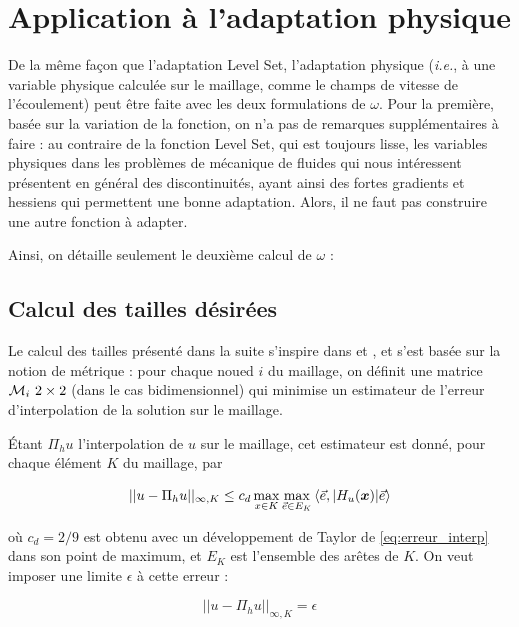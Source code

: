 \section{Application à l'adaptation physique}
\label{sec:adapPhysique}

\indent De la même façon que l'adaptation Level Set, l'adaptation physique (\emph{i.e.}, à une variable physique calculée sur le maillage, comme le champs de vitesse de l'écoulement) peut être faite avec les deux formulations de \(\omega\). Pour la première, basée sur la variation de la fonction, on n'a pas de remarques supplémentaires à faire : au contraire de la fonction Level Set, qui est toujours lisse, les variables physiques dans les problèmes de mécanique de fluides qui nous intéressent présentent en général des discontinuités, ayant ainsi des fortes gradients et hessiens qui permettent une bonne adaptation. Alors, il ne faut pas construire une autre fonction à adapter. 

\indent Ainsi, on détaille seulement le deuxième calcul de \(\omega\) :

\subsection{Calcul des tailles désirées}

\indent Le calcul des tailles présenté dans la suite s'inspire dans \cite{cecile_these} et \cite{frey_alauzet}, et s'est basée sur la notion de métrique : pour chaque noued \(i\) du maillage, on définit une matrice \(\met_i \ 2 \times 2\) (dans le cas bidimensionnel) qui minimise un estimateur de l'erreur d'interpolation de la solution sur le maillage.

\indent Étant \(\Pi_hu\) l'interpolation de \(u\) sur le maillage, cet estimateur est donné, pour chaque élément \(K\) du maillage, par

\begin{equation}
	\label{eq:erreur_interp}
	||u-\Pi_hu||_{\infty,K} \leq c_d \max_{x \in K}{\max_{\vec{e} \in E_K}{\langle \vec{e}, |H_u(\boldsymbol{x})| \vec{e} \rangle}}
\end{equation}

\noindent où \(c_d = 2/9 \) est obtenu avec un développement de Taylor de \eqref{eq:erreur_interp} dans son point de maximum, et $E_K$ est l'ensemble des arêtes de $K$. On veut imposer une  limite \(\epsilon\) à cette erreur : 

\begin{equation*}
	||u-\Pi_hu||_{\infty,K} = \epsilon
\end{equation*}

